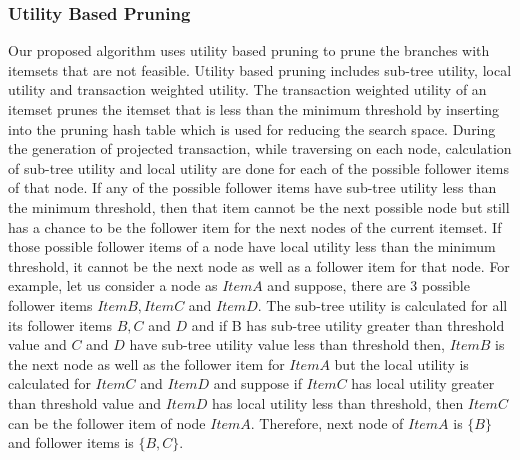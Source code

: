 \documentclass[11pt,openright]{report}
\begin{document}
\subsubsection{Utility Based Pruning}
Our proposed algorithm uses utility based pruning to prune the branches with itemsets that are not feasible. Utility based pruning includes sub-tree utility, local utility and transaction weighted utility. The transaction weighted utility of an itemset prunes the itemset that is less than the minimum threshold by inserting into the pruning hash table which is used for reducing the search space. During the generation of projected transaction, while traversing on each node, calculation of sub-tree utility and local utility are done for each of the possible follower items of that node. If any of the possible follower items have sub-tree utility less than the minimum threshold, then that item cannot be the next possible node but still has a chance to be the follower item for the next nodes of the current itemset. If those possible follower items of a node have local utility less than the minimum threshold, it cannot be the next node as well as a follower item for that node. For example, let us consider a node as $Item A$ and suppose, there are 3 possible follower items $Item B, Item C$ and $Item D$. The sub-tree utility is calculated for all its follower items $B, C$ and $D$ and if B has sub-tree utility  greater than threshold value and $C$ and $D$ have sub-tree utility value less than threshold then, $Item B$ is the next node as well as the follower item for $Item A$ but the local utility is calculated for $Item C$ and $Item D$ and suppose if $Item C$ has local utility greater than threshold value and $Item D$ has local utility less than threshold, then $Item C$ can be the follower item of node $Item A$. Therefore, next node of $Item A$ is $\{B\}$ and follower items is $\{B,C\}$.
\end{document}
